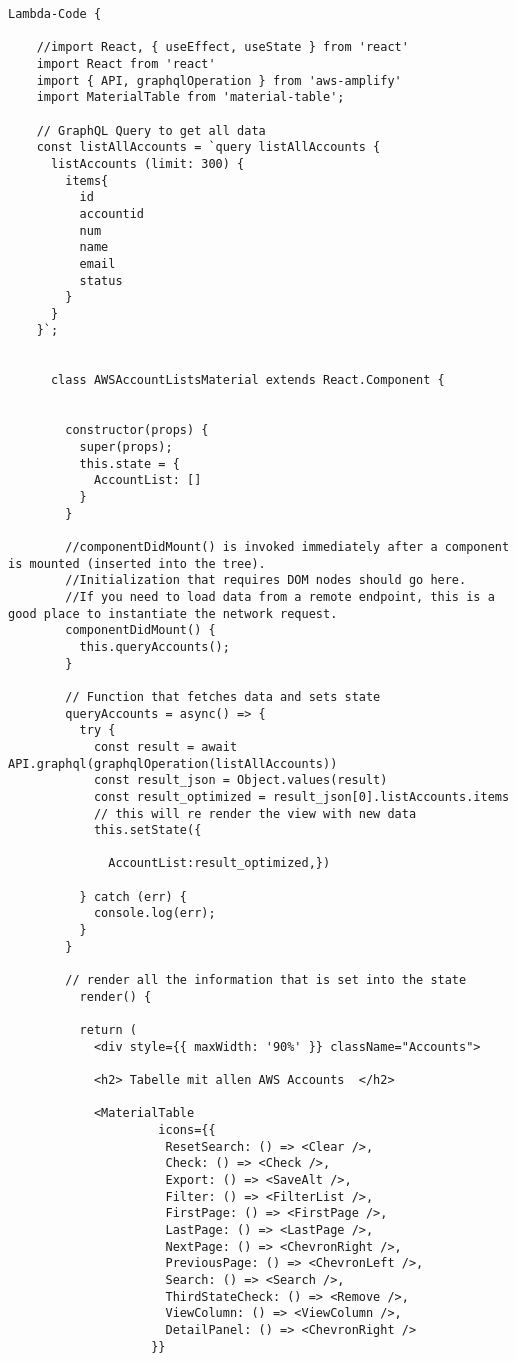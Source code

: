 

\begin{lstlisting}[caption={React AccountsList.js},
label=lst:React AccountList,basicstyle=\ttfamily\small ] Lambda-Code {

    //import React, { useEffect, useState } from 'react'
    import React from 'react'
    import { API, graphqlOperation } from 'aws-amplify'
    import MaterialTable from 'material-table';

    // GraphQL Query to get all data
    const listAllAccounts = `query listAllAccounts {
      listAccounts (limit: 300) {
        items{
          id
          accountid
          num
          name
          email
          status
        }
      }
    }`;


      class AWSAccountListsMaterial extends React.Component {


        constructor(props) {
          super(props);
          this.state = {
            AccountList: []
          }
        }

        //componentDidMount() is invoked immediately after a component is mounted (inserted into the tree).
        //Initialization that requires DOM nodes should go here.
        //If you need to load data from a remote endpoint, this is a good place to instantiate the network request.
        componentDidMount() {
          this.queryAccounts();
        }

        // Function that fetches data and sets state
        queryAccounts = async() => {
          try {
            const result = await API.graphql(graphqlOperation(listAllAccounts))
            const result_json = Object.values(result)
            const result_optimized = result_json[0].listAccounts.items
            // this will re render the view with new data
            this.setState({

              AccountList:result_optimized,})

          } catch (err) {
            console.log(err);
          }
        }

        // render all the information that is set into the state
          render() {

          return (
            <div style={{ maxWidth: '90%' }} className="Accounts">

            <h2> Tabelle mit allen AWS Accounts  </h2>

            <MaterialTable
                     icons={{
                      ResetSearch: () => <Clear />,
                      Check: () => <Check />,
                      Export: () => <SaveAlt />,
                      Filter: () => <FilterList />,
                      FirstPage: () => <FirstPage />,
                      LastPage: () => <LastPage />,
                      NextPage: () => <ChevronRight />,
                      PreviousPage: () => <ChevronLeft />,
                      Search: () => <Search />,
                      ThirdStateCheck: () => <Remove />,
                      ViewColumn: () => <ViewColumn />,
                      DetailPanel: () => <ChevronRight />
                    }}


\end{lstlisting}
